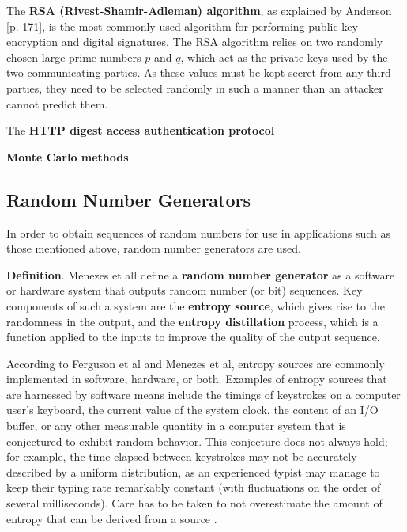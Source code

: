 \documentclass[12pt, titlepage]{report}
\theoremstyle{definition}
\begin{document}
The \textbf{RSA (Rivest-Shamir-Adleman) algorithm}, as explained by Anderson [p. 171]\cite{anderson2010security}, is the most commonly used algorithm for performing public-key encryption and digital signatures. The RSA algorithm relies on two randomly chosen large prime numbers $p$ and $q$, which act as the private keys used by the two communicating parties. As these values must be kept secret from any third parties, they need to be selected randomly in such a manner than an attacker cannot predict them.

The \textbf{HTTP digest access authentication protocol} 

\textbf{Monte Carlo methods} 



\subsection{Random Number Generators}
In order to obtain sequences of random numbers for use in applications such as those mentioned above, random number generators are used.

\textbf{Definition}. Menezes et all \cite{menezes1996handbook} define a \textbf{random number generator} as a software or hardware system that outputs random number (or bit) sequences. Key components of such a system are the \textbf{entropy source}, which gives rise to the randomness in the output, and the \textbf{entropy distillation} process, which is a function applied to the inputs to improve the quality of the output sequence.

According to Ferguson et al and Menezes et al, entropy sources are commonly implemented in software, hardware, or both. Examples of entropy sources that are harnessed by software means include the timings of keystrokes on a computer user's keyboard, the current value of the system clock, the content of an I/O buffer, or any other measurable quantity in a computer system that is conjectured to exhibit random behavior. This conjecture does not always hold; for example, the time elapsed between keystrokes may not be accurately described by a uniform distribution, as an experienced typist may manage to keep their typing rate remarkably constant (with fluctuations on the order of several milliseconds). Care has to be taken to not overestimate the amount of entropy that can be derived from a source \cite[p. 138-139]{ferguson2010cryptography} \cite[p. 171-172]{menezes1996handbook}.
\end{document}
